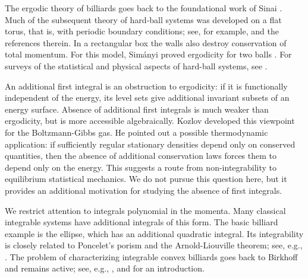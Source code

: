 \documentclass[12pt,reqno]{amsart}
\numberwithin{equation}{section}
\begin{document}
The ergodic theory of billiards goes back to the foundational work of Sinai
\cite{Sinai}. Much of the subsequent theory of hard-ball systems was
developed on a flat torus, that is, with periodic boundary conditions; see,
for example, \cite{Sinai-Chernov,Simanyi-2,Simanyi-3, Simanyi-4} and the references
therein. In a rectangular box the walls also destroy conservation of total
momentum. For this model, Sim\'anyi proved ergodicity for two balls
\cite{Simanyi-1}. For 
surveys of the statistical and physical aspects of hard-ball systems, see
\cite{Szasz,ChernovYoung,Liverani}.
\smallskip%

An additional first integral is an obstruction to ergodicity: if it is
functionally independent of the energy, its level sets give additional
invariant subsets of an energy 
surface. Absence of additional first integrals
is much weaker than ergodicity, but is more accessible algebraically. Kozlov \cite{Kozlov} developed this viewpoint for the Boltzmann-Gibbs gas. He pointed out a possible thermodynamic application: if sufficiently
regular stationary densities depend only on conserved quantities, then the
absence of additional conservation laws forces them to depend only on the
energy. This suggests a route from non-integrability to equilibrium
statistical mechanics. We do not pursue this question here, but it provides an additional motivation for studying the absence of first integrals.
\smallskip%

We restrict attention to integrals polynomial in the momenta. Many classical
integrable systems have additional integrals of this form. The basic billiard
example is the ellipse, which has an additional quadratic integral. Its
integrability is closely related to Poncelet's porism and the
Arnold-Liouville theorem; see, e.g.,
\cite{Levi-Tabachnikov,Izo}. The problem of characterizing integrable convex billiards goes back to
Birkhoff and remains active; see, e.g.,
\cite{Mather,Treschev,Avila-DSim-Kalosh,Kalosh-Sorr,Bialy-Mir},
and \cite{Tabachnikov} for an introduction.
\smallskip%
\end{document}
